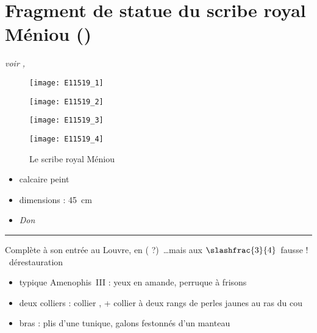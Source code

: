 \documentclass[dvipsnames,a4paper,twoside,10pt,openany,article]{memoir}
\newcommand{\separation}{%
  {\noi\hspace*{\fill}\rule{.33\textwidth}{1pt}\hspace*{\fill}}%
}
\begin{document}
\chapter{Fragment de statue du scribe royal Méniou ()}
\label{sec:E11519}

\puceb{} \emph{voir , }
\bigskip

\begin{figure}[!h]
  \noi\begin{minipage}[m]{0.50\textwidth}
    \centerfloat
    \texttt{[image: E11519\_1]}
  \end{minipage}%
  \hspace{\fill}%
  \begin{minipage}[m]{0.50\textwidth}
    \centerfloat
    \texttt{[image: E11519\_2]}
  \end{minipage}%

  \noi\begin{minipage}[m]{0.50\textwidth}
    \centerfloat
    \texttt{[image: E11519\_3]}
  \end{minipage}%
  \hspace{\fill}%
  \begin{minipage}[m]{0.50\textwidth}
    \centerfloat
    \texttt{[image: E11519\_4]}
  \end{minipage}%
  \caption{Le scribe royal Méniou }
  \label{fig:E11519}
\end{figure}

\begin{itemize}
  \item calcaire peint
  \item dimensions : \SI{45}{\cm}
  \item \emph{Don }
\end{itemize}

\separation

Complète à son entrée au Louvre, en  
( ?)~\dots mais aux $\slashfrac{3}{4}$~fausse ! 
\donc~dérestauration

\begin{itemize}
  \item typique Amenophis~III : yeux en amande, perruque à frisons
  \item deux colliers : collier , + collier à deux 
        rangs de perles jaunes au ras du cou
  \item bras : plis d'une tunique, galons festonnés d'un manteau
\end{itemize}
\end{document}
